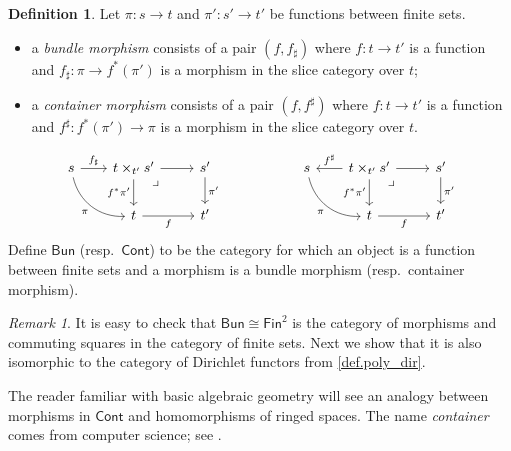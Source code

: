 \documentclass[11pt, article, one side]{memoir}
\theoremstyle{theorem}
\theoremstyle{definition}
\newtheorem{definition}[equation]{Definition}
\theoremstyle{remark}
\newtheorem{remark}[equation]{Remark}
\newcommand{\Cat}[1]{\mathsf{#1}}%
\newcommand{\finset}{\Cat{Fin}}
\newcommand{\cont}{\Cat{Cont}}
\newcommand{\bun}{\Cat{Bun}}
\begin{document}
\begin{definition}\label{def.sheaves_bundles}
Let $\pi\colon s\to t$ and $\pi'\colon s'\to t'$ be functions between finite sets.
\begin{itemize}
	\item a \emph{bundle morphism} consists of a pair $(f,f_\sharp)$ where $f\colon t\to t'$ is a function and $f_\sharp\colon \pi\to f^*(\pi')$ is a morphism in the slice category over $t$;
	\item a \emph{container morphism} consists of a pair $(f,f^\sharp)$ where $f\colon t\to t'$ is a function and $f^\sharp\colon f^*(\pi')\to \pi$ is a morphism in the slice category over $t$.
\end{itemize}
\begin{equation}\label{eqn.bund_cont_maps}
\begin{tikzcd}
s\ar[dr, bend right=40pt, "\pi"']&[-5pt]
t\times_{t'}s'\ar[r]\ar[d, "f^*\pi'"']\ar[from=l, "f_\sharp"]&
s'\ar[d, "\pi'"]\\&
t\ar[r, "f"']&
t'\ar[ul, phantom, very near end, "\lrcorner"]
\end{tikzcd}
\hspace{.75in}
\begin{tikzcd}
s\ar[dr, bend right=40pt, "\pi"']&[-5pt]
t\times_{t'}s'\ar[r]\ar[d, "f^*\pi'"']\ar[l, "f^\sharp"']&
s'\ar[d, "\pi'"]\\&
t\ar[r, "f"']&
t'\ar[ul, phantom, very near end, "\lrcorner"]
\end{tikzcd}
\end{equation}
Define $\bun$ (resp.\ $\cont$) to be the category for which an object is a function between finite sets and a morphism is a bundle morphism (resp.\ container morphism).
\end{definition}

\begin{remark}
It is easy to check that $\bun\cong\finset^2$ is the category of morphisms and commuting squares in the category of finite sets. Next we show that it is also isomorphic to the category of Dirichlet functors from \cref{def.poly_dir}.

The reader familiar with basic algebraic geometry will see an analogy between morphisms in $\cont$ and homomorphisms of ringed spaces. The name \emph{container} comes from computer science; see \cite{**}.
\end{remark}
\end{document}
